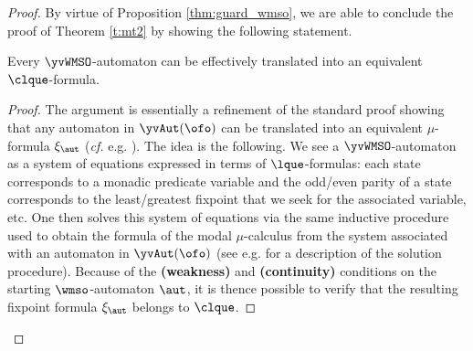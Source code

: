 \begin{proof}
By virtue of Proposition \ref{thm:guard_wmso}, we are able to conclude the proof of Theorem \ref{t:mt2} by showing the following statement.
\begin{proposition}\label{thm:wmsoauttof}
Every $\yvWMSO$-automaton can be effectively translated into an equivalent $\clque$-formula.
\end{proposition}
%
%
%
%
\begin{proof} The argument is
 essentially a refinement of the standard proof showing that any automaton in $\yvAut(\ofo)$ can be translated into an equivalent $\mu$-formula
$\xi_\aut$ (\emph{cf.} e.g. \cite{Ven08}).
The idea is the following. We see a $\yvWMSO$-automaton as a system of equations expressed in terms of $\lque$-formulas: each state corresponds to a monadic predicate variable and the odd/even parity of a state corresponds to the least/greatest fixpoint that we seek for the associated variable, etc. One then solves this system of equations via the same inductive procedure used to obtain the formula of the modal $\mu$-calculus from the system associated with an automaton in $\yvAut(\ofo)$ (see e.g. \cite{ArnoldN01} for a description of the solution procedure). Because of the \textbf{(weakness)} and \textbf{(continuity)} conditions on the starting $\wmso$-automaton $\aut$, it is thence possible to verify that the resulting fixpoint formula $\xi_\aut$ belongs to $\clque$.
%

\end{proof}
\end{proof}
